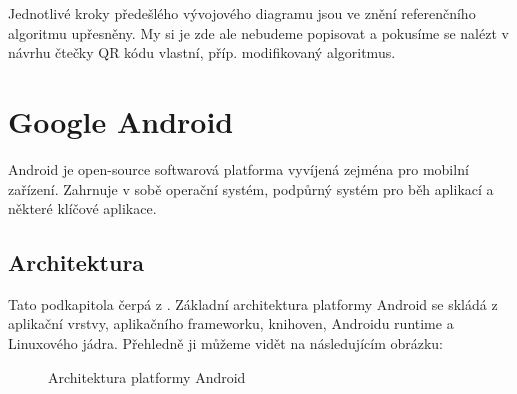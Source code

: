 Jednotlivé kroky předešlého vývojového diagramu jsou ve znění referenčního
algoritmu upřesněny. My si je zde ale nebudeme popisovat a pokusíme se nalézt 
v návrhu čtečky QR kódu vlastní, příp. modifikovaný algoritmus.

\chapter{Google Android}
\label{android}

Android je open-source softwarová platforma vyvíjená zejména pro mobilní
zařízení. Zahrnuje v sobě operační systém, podpůrný systém pro běh aplikací 
a některé klíčové aplikace.

\section{Architektura}
\label{AndroidArchitektura}

Tato podkapitola čerpá z \cite{whatISAndroid}. Základní
architektura platformy Android se skládá z aplikační vrstvy, aplikačního frameworku, knihoven, Androidu runtime a Linuxového jádra.
Přehledně ji můžeme vidět na následujícím obrázku:

\begin{figure}[H]
  \begin{center}
    \caption{Architektura platformy Android \cite{AndroidProfessionals}}
    \label{AndroidArchitecture}
  \end{center}
\end{figure}

